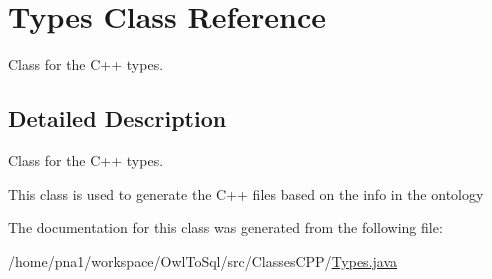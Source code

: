 \hypertarget{class_types}{
\section{Types Class Reference}
\label{class_types}
}


Class for the C++ types.  




\subsection{Detailed Description}
Class for the C++ types. 

This class is used to generate the C++ files based on the info in the ontology 

The documentation for this class was generated from the following file:\begin{DoxyCompactItemize}
\item 
/home/pna1/workspace/OwlToSql/src/ClassesCPP/\hyperlink{_types_8java}{Types.java}\end{DoxyCompactItemize}
